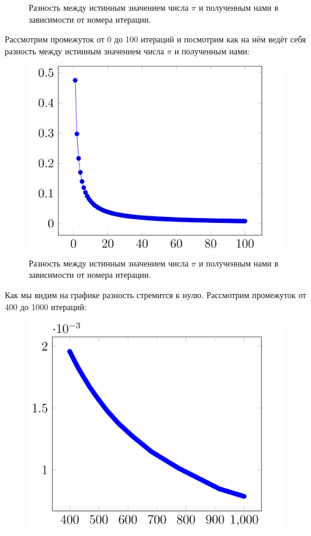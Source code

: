 \documentclass[a4paper, 12pt]{article}
\begin{document}
\begin{enumerate}
\begin{enumerate}
\begin{figure}[h!]
        			            \caption{Разность между истинным значением числа $\pi$ и полученным нами в зависимости от номера итерации.}
        			            \label{fig:my_label}
        		          \end{figure}
                            \bigskip
                            \[\]
                            Рассмотрим промежуток от 0 до 100 итераций и посмотрим как на нём ведёт себя разность между истииным значением числа $\pi$ и полученным нами:
                            \begin{figure}[h!]
        			        \centering
        			            \includegraphics[scale = 0.16]{2-3.png}
        			            \caption{Разность между истинным значением числа $\pi$ и полученным нами в зависимости от номера итерации.}
        			            \label{fig:my_label}
        		          \end{figure}
                            \[\]
                            Как мы видим на графике разность стремится к нулю.
                            \newpage
                            Рассмотрим промежуток от 400 до 1000 итераций:
                            \begin{figure}[h!]
        			        \centering
        			            \includegraphics[scale = 0.25]{2-4.png}

\end{figure}
\end{enumerate}
\end{enumerate}
\end{document}
